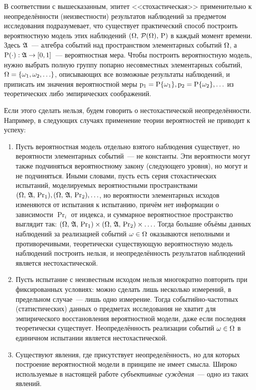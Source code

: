В соответствии с вышесказанным, эпитет <<стохастическая>> применительно к  неопределённости (неизвестности) результатов наблюдений за предметом исследования подразумевает, что существует практический способ построить вероятностную модель этих наблюдений %
${(\Omega,\,\mathcal{P}(\Omega),\,{\mathrm{P}})}$ в каждый момент времени. Здесь ${\mathfrak{A}}$~--- алгебра событий над пространством элементарных событий $\Omega$, а ${\mathrm{P}}(\cdot): {\mathfrak{A}} \to [0,1]$~--- вероятностная мера. Чтобы построить вероятностную модель, нужно выбрать полную группу попарно несовместных элементарных событий, $\Omega = \{\omega_1, \omega_2, \ldots\}$, описывающих все возможные результаты наблюдений, и приписать им значения вероятностной меры ${\mathrm{p}}_1 = {\mathrm{P}}\{\omega_1\}, {\mathrm{p}}_2 = {\mathrm{P}}\{\omega_2\}, \ldots$ из теоретических либо эмпирических соображений. 

Если этого сделать нельзя, будем говорить о нестохастической неопределённости. Например, в следующих случаях применение теории вероятностей не приводит к успеху:
\begin{enumerate}
  \item Пусть вероятностная модель отдельно взятого наблюдения существует, но вероятности элементарных событий~--- не константы. Эти вероятности могут также подчиняться вероятностному закону (следующего уровня), но могут и не подчиняться. Иными словами, пусть есть серия стохастических испытаний, моделируемых вероятностными пространствами ${(\Omega,\, {\mathfrak{A}},\,{\mathrm{Pr}}_{1})}, {(\Omega,\, {\mathfrak{A}},\,{\mathrm{Pr}}_{2})}, \ldots$, но вероятности элементарных исходов изменяются от испытания к испытанию, причём нет информации о зависимости $\Pr_{i}$ от индекса, и суммарное вероятностное пространство выглядит так: ${(\Omega,\, {\mathfrak{A}},\,{\mathrm{Pr}}_{1})} \times {(\Omega,\, {\mathfrak{A}},\,{\mathrm{Pr}}_{2})} \times \ldots$. Тогда большие объёмы данных наблюдений за реализацией событий $\omega \in \Omega$ оказываются неполными и противоречивыми, теоретически существующую вероятностную модель наблюдений построить нельзя, и неопределённость результатов наблюдений является нестохастической. 
  \item Пусть испытание с неизвестным исходом нельзя многократно повторить при фиксированных условиях: можно сделать лишь несколько измерений, в предельном случае~--- лишь одно измерение. Тогда событийно-частотных (статистических) данных о предметах исследования не хватит для эмпирического восстановления вероятностной модели, даже если последняя теоретически существует. Неопределённость реализации событий $\omega \in \Omega$ в единичном испытании является нестохастической. 
  \item Существуют явления, где присутствует неопределённость, но для которых построение вероятностной модели в принципе не имеет смысла. Широко используемые в настоящей работе {\sl субъективные суждения}~--- одно из таких явлений. 
\end{enumerate} 

